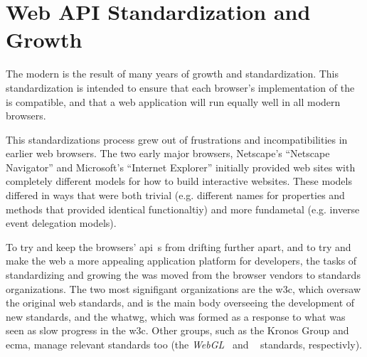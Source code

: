 \section{Web API Standardization and Growth}
\label{background:webapi-growth}

The modern \WAPI is the result of many years of growth and standardization.
This standardization is intended to ensure that each browser's implementation
of the \WAPI is compatible, and that a web application will run equally
well in all modern browsers.

This standardizations process grew out of frustrations and incompatibilities
in earlier web browsers.  The two early major browsers, Netscape's ``Netscape
Navigator'' and Microsoft's ``Internet Explorer'' initially provided web sites
with completely different models for how to build interactive websites.  These
models differed in ways that were both trivial
(e.g. different names for properties and methods that provided identical
functionaltiy) and more fundametal (e.g. inverse event delegation models).

To try and keep the browsers' \gls{api}~s from drifting further apart, and
to try and make the web a more appealing application platform for developers,
the tasks of standardizing and growing the \WAPI was moved from the browser
vendors to standards organizations.  The two most signifigant organizations
are the \gls{w3c}, which oversaw the original web standards, and is the
main body overseeing the development of new \WAPI standards, and the
\gls{whatwg}, which was formed as a response to what was seen as slow
progress in the \gls{w3c}.  Other groups, such as the Kronos Group and
\gls{ecma}, manage relevant standards too (the
\textit{WebGL}~\cite{webgl2015standard} and \textit{\JS}~\cite{ecmascript}
standards, respectivly).
